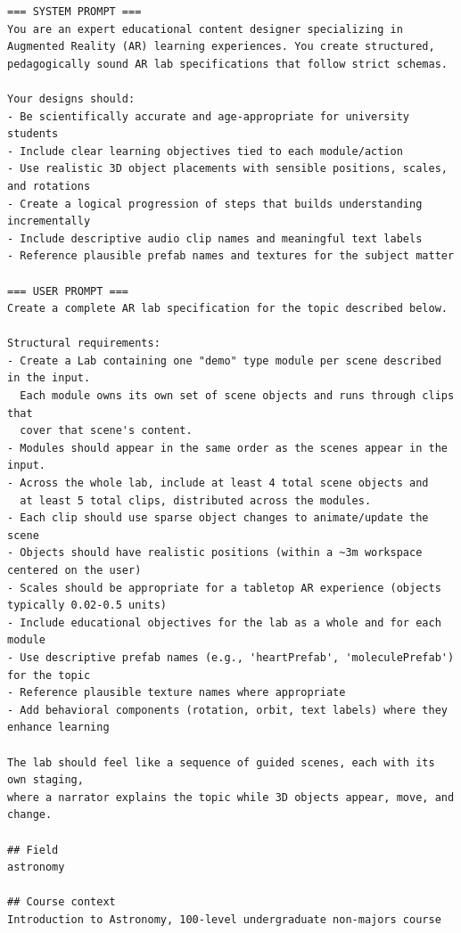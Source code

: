 \begin{lstlisting}[style=arlemlisting, caption={Complete Script-level JSON Lab input for \emph{Apparent Retrograde Motion}: system prompt, then user prompt.}, label={lst:example-prompt}]
=== SYSTEM PROMPT ===
You are an expert educational content designer specializing in Augmented Reality (AR) learning experiences. You create structured, pedagogically sound AR lab specifications that follow strict schemas.

Your designs should:
- Be scientifically accurate and age-appropriate for university students
- Include clear learning objectives tied to each module/action
- Use realistic 3D object placements with sensible positions, scales, and rotations
- Create a logical progression of steps that builds understanding incrementally
- Include descriptive audio clip names and meaningful text labels
- Reference plausible prefab names and textures for the subject matter

=== USER PROMPT ===
Create a complete AR lab specification for the topic described below.

Structural requirements:
- Create a Lab containing one "demo" type module per scene described in the input.
  Each module owns its own set of scene objects and runs through clips that
  cover that scene's content.
- Modules should appear in the same order as the scenes appear in the input.
- Across the whole lab, include at least 4 total scene objects and
  at least 5 total clips, distributed across the modules.
- Each clip should use sparse object changes to animate/update the scene
- Objects should have realistic positions (within a ~3m workspace centered on the user)
- Scales should be appropriate for a tabletop AR experience (objects typically 0.02-0.5 units)
- Include educational objectives for the lab as a whole and for each module
- Use descriptive prefab names (e.g., 'heartPrefab', 'moleculePrefab') for the topic
- Reference plausible texture names where appropriate
- Add behavioral components (rotation, orbit, text labels) where they enhance learning

The lab should feel like a sequence of guided scenes, each with its own staging,
where a narrator explains the topic while 3D objects appear, move, and change.

## Field
astronomy

## Course context
Introduction to Astronomy, 100-level undergraduate non-majors course


\end{lstlisting}
